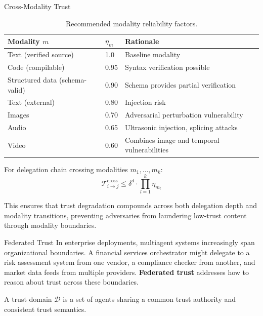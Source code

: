 \documentclass[
  ignorenonframetext,
]{beamer}
\begin{document}
\begin{frame}[allowframebreaks]{Cross-Modality Trust}
\begin{table}[htbp]
\centering
\caption{Recommended modality reliability factors.}
\label{tab:modality-factors}
\begin{tabular}{@{}llp{5cm}@{}}
\toprule
Modality $m$ & $\eta_m$ & Rationale \\
\midrule
Text (verified source) & 1.0 & Baseline modality \\
Code (compilable) & 0.95 & Syntax verification possible \\
Structured data (schema-valid) & 0.90 & Schema provides partial verification \\
Text (external) & 0.80 & Injection risk \\
Images & 0.70 & Adversarial perturbation vulnerability \\
Audio & 0.65 & Ultrasonic injection, splicing attacks \\
Video & 0.60 & Combines image and temporal vulnerabilities \\
\bottomrule
\end{tabular}
\end{table}

\begin{theorem}
\label{thm:cross-modality-bound}
For delegation chain crossing modalities $m_1, \ldots, m_k$:
\begin{equation}
\label{eq:cross-modality-bound}
\mathcal{T}_{i \to j}^{\text{cross}} \leq \delta^d \cdot \prod_{l=1}^{k} \eta_{m_l}
\end{equation}
\end{theorem}

This ensures that trust degradation compounds across both delegation
depth and modality transitions, preventing adversaries from laundering
low-trust content through modality boundaries.
\end{frame}

\begin{frame}[allowframebreaks]{Federated Trust}
\protect{}\label{sec:federated-trust}
In enterprise deployments, multiagent systems increasingly span
organizational boundaries. A financial services orchestrator might
delegate to a risk assessment system from one vendor, a compliance
checker from another, and market data feeds from multiple providers.
\textbf{Federated trust} addresses how to reason about trust across
these boundaries.

\begin{definition}
\label{def:trust-domain}
A trust domain $\mathcal{D}$ is a set of agents sharing a common trust authority and consistent trust semantics.
\end{definition}

\end{frame}
\end{document}
